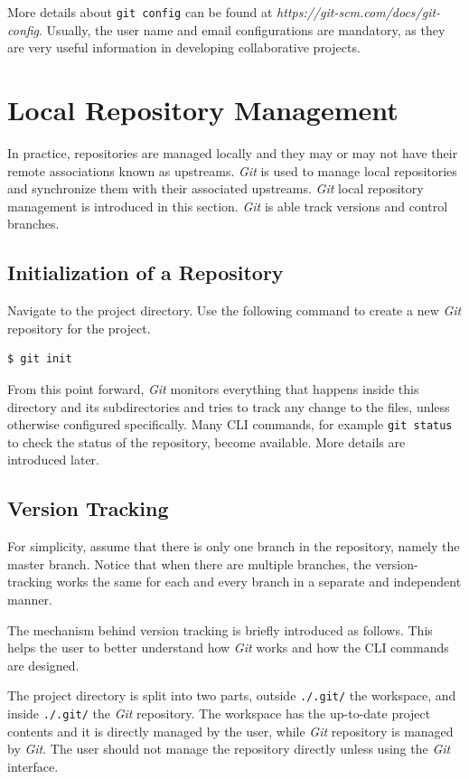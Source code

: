 More details about \verb|git config| can be found at \textit{https://git-scm.com/docs/git-config}. Usually, the user name and email configurations are mandatory, as they are very useful information in developing collaborative projects.

\section{Local Repository Management}

In practice, repositories are managed locally and they may or may not have their remote associations known as upstreams. \textit{Git} is used to manage local repositories and synchronize them with their associated upstreams. \textit{Git} local repository management is introduced in this section. \textit{Git} is able track versions and control branches.

\subsection{Initialization of a Repository}

Navigate to the project directory. Use the following command to create a new \textit{Git} repository for the project.
\begin{lstlisting}
$ git init
\end{lstlisting}
From this point forward, \textit{Git} monitors everything that happens inside this directory and its subdirectories and tries to track any change to the files, unless otherwise configured specifically. Many CLI commands, for example \verb|git status| to check the status of the repository, become available. More details are introduced later.

\subsection{Version Tracking}

For simplicity, assume that there is only one branch in the repository, namely the master branch. Notice that when there are multiple branches, the version-tracking works the same for each and every branch in a separate and independent manner.

The mechanism behind version tracking is briefly introduced as follows. This helps the user to better understand how \textit{Git} works and how the CLI commands are designed.

The project directory is split into two parts, outside \verb|./.git/| the workspace, and inside \verb|./.git/| the \textit{Git} repository. The workspace has the up-to-date project contents and it is directly managed by the user, while \textit{Git} repository is managed by \textit{Git}. The user should not manage the repository directly unless using the \textit{Git} interface.


